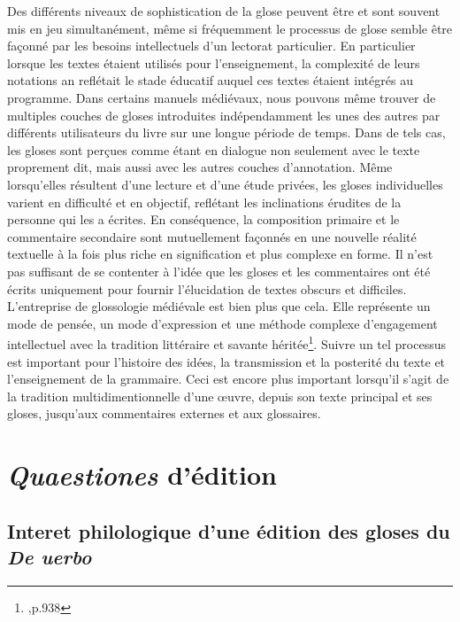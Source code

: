 \documentclass[a4paper, twoside, 12pt]{book}
\begin{document}
Des différents niveaux de sophistication de la glose peuvent être et sont souvent mis en jeu simultanément, même si fréquemment le processus de glose semble être façonné par les besoins intellectuels d'un lectorat particulier. En particulier lorsque les textes étaient utilisés pour l'enseignement, la complexité de leurs notations an reflétait le stade éducatif auquel ces textes étaient intégrés au programme. Dans certains manuels médiévaux, nous pouvons même trouver de multiples couches de gloses introduites indépendamment les unes des autres par différents utilisateurs du livre sur une longue période de temps. Dans de tels cas, les gloses sont perçues comme étant en dialogue non seulement avec le texte proprement dit, mais aussi avec les autres couches d'annotation. Même lorsqu'elles résultent d'une lecture et d'une étude privées, les gloses individuelles varient en difficulté et en objectif, reflétant les inclinations érudites de la personne qui les a écrites. En conséquence, la composition primaire et le commentaire secondaire sont mutuellement façonnés en une nouvelle réalité textuelle à la fois plus riche en signification et plus complexe en forme. Il n'est pas suffisant de se contenter à l'idée que les gloses et les commentaires ont été écrits uniquement pour fournir l'élucidation de textes obscurs et difficiles. L'entreprise de glossologie médiévale est bien plus que cela. Elle représente un mode de pensée, un mode d'expression et une méthode complexe d'engagement intellectuel avec la tradition littéraire et savante héritée\footnote{\cite{dinkova2020text},p.938}. Suivre un tel processus est important pour l'histoire des idées, la transmission et la posterité du texte et l'enseignement de la grammaire. Ceci est encore plus important lorsqu'il s'agit de la tradition multidimentionnelle d'une œuvre, depuis son texte principal et ses gloses, jusqu'aux commentaires externes et aux glossaires.


\section{\textit{Quaestiones} d'édition}

\subsection{Interet philologique d'une édition des gloses du \textit{De uerbo}}
\end{document}
